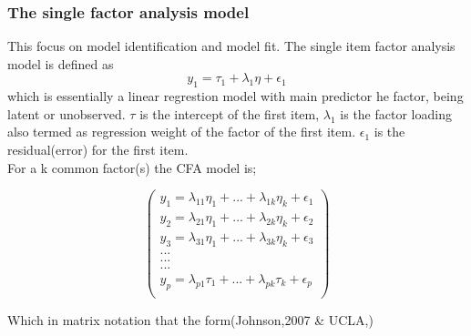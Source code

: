 \documentclass[12pt]{article}
\begin{document}
\subsubsection{The single factor analysis model}
This focus on model identification and model fit. The single item factor analysis model is defined as
\begin{equation*}
	y_1=\tau_1 +\lambda_1 \eta + \epsilon_1
\end{equation*}
which is essentially a linear regrestion model with main predictor he factor, being latent or unobserved. $\tau$ is the intercept of the first item, $\lambda_1$ is the factor loading also termed as regression weight of the factor of the first item. $\epsilon_1$ is the residual(error) for the first item.\\
For a k common factor(s) the CFA model is;\\
\begin{center}
	\[
\left(
\begin{matrix}
	y_1= \lambda_{11}\eta_1 +...+\lambda_{1k}\eta_k +\epsilon_1 \\
	y_2= \lambda_{21}\eta_1 +...+\lambda_{2k}\eta_k +\epsilon_2 \\
	y_3 = \lambda_{31}\eta_1+...+\lambda_{3k}\eta_k +\epsilon_3 \\
	                .                  .              .      \\
	                .                  .               .     \\
	                .                  .              .     \\
	y_p=\lambda_{p1}\tau_1+...+\lambda_{pk}\tau_k +\epsilon_p \\                
	
\end{matrix}
\right)
\]
\end{center}
Which in matrix notation that the form(Johnson,2007 \& UCLA,)\\
\end{document}

